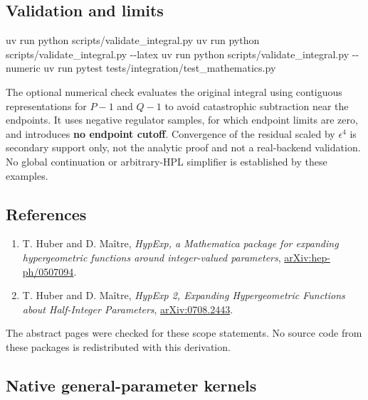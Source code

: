 \documentclass[
  11pt,
]{article}
\newenvironment{Shaded}{}{}
\newcommand{\AttributeTok}[1]{\textcolor[rgb]{0.49,0.56,0.16}{#1}}
\newcommand{\ExtensionTok}[1]{#1}
\newcommand{\NormalTok}[1]{#1}
\providecommand{\tightlist}{%
  \setlength{\itemsep}{0pt}\setlength{\parskip}{0pt}}
\begin{document}
\subsection{Validation and limits}\label{validation-and-limits}

\begin{Shaded}
\begin{Highlighting}[]
\ExtensionTok{uv}\NormalTok{ run python scripts/validate\_integral.py}
\ExtensionTok{uv}\NormalTok{ run python scripts/validate\_integral.py }\AttributeTok{{-}{-}latex}
\ExtensionTok{uv}\NormalTok{ run python scripts/validate\_integral.py }\AttributeTok{{-}{-}numeric}
\ExtensionTok{uv}\NormalTok{ run pytest tests/integration/test\_mathematics.py}
\end{Highlighting}
\end{Shaded}

The optional numerical check evaluates the original integral using
contiguous representations for \(P-1\) and \(Q-1\) to avoid catastrophic
subtraction near the endpoints. It uses negative regulator samples, for
which endpoint limits are zero, and introduces \textbf{no endpoint
cutoff}. Convergence of the residual scaled by \(\epsilon^4\) is
secondary support only, not the analytic proof and not a real-backend
validation. No global continuation or arbitrary-HPL simplifier is
established by these examples.

\subsection{References}\label{references}

\begin{enumerate}
\def\labelenumi{\arabic{enumi}.}
\tightlist
\item
  T. Huber and D. Maître, \emph{HypExp, a Mathematica package for
  expanding hypergeometric functions around integer-valued parameters},
  \href{https://arxiv.org/abs/hep-ph/0507094}{arXiv:hep-ph/0507094}.
\item
  T. Huber and D. Maître, \emph{HypExp 2, Expanding Hypergeometric
  Functions about Half-Integer Parameters},
  \href{https://arxiv.org/abs/0708.2443}{arXiv:0708.2443}.
\end{enumerate}

The abstract pages were checked for these scope statements. No source
code from these packages is redistributed with this derivation.

\subsection{Native general-parameter
kernels}\label{native-general-parameter-kernels}
\end{document}
